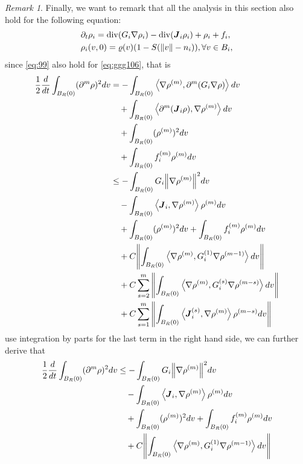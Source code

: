 \documentclass[a4paper, 11pt]{article}
\newcommand{\inner}[2]{\left< #1 , #2 \right>}
\newcounter{results}[section]
\theoremstyle{plain}
\theoremstyle{remark}
\newtheorem{remark}[results]{Remark}
\theoremstyle{definition}
\renewcommand{\div}{\mathrm{div}}
\newcommand{\intr}{\int_{B_R(0)}}
\newcommand{\J}{\boldsymbol{J}}
\begin{document}
\begin{remark}\label{rmk:g47}
Finally, we want to remark that all the analysis in this section also hold for the following equation:
\begin{equation}\label{eq:ggg106}
\begin{aligned}
&\partial_t\rho_i=\div(G_i\nabla\rho_i)-\div({\J_i}{\rho_i})+\rho_i+f_i,\\
&\rho_i(v,0)=\varrho(v)(1-S(\norm{v}-n_i)),\forall v\in B_i,
\end{aligned}
\end{equation}
since \eqref{eq:99} also hold for \eqref{eq:ggg106}, that is
\begin{equation}
\begin{aligned}
	\frac{1}{2}\frac{d}{dt}\intr(\partial^m\rho)^2dv&=-\intr\inner{\nabla\rho^{(m)}}{\partial^m(G_i\nabla\rho)}dv\\
&\quad+\intr\inner{\partial^m(\J_i\rho)}{\nabla\rho^{(m)}}dv\\
&\quad+\intr(\rho^{(m)})^2dv\\
&\quad+\intr f^{(m)}_i\rho^{(m)} dv\\
&\leq -\intr G_i\norm{\nabla\rho^{(m)}}^2 dv\\
&\quad-\intr\inner{\J_i}{\nabla\rho^{(m)}}\rho^{(m)}dv\\
&\quad+\intr(\rho^{(m)})^2dv+\intr f_i^{(m)}\rho^{(m)} dv\\
&\quad +C\norm{\intr\inner{\nabla\rho^{(m)}}{G_i^{(1)}\nabla\rho^{(m-1)}}dv}\\
&\quad+C\sum_{s=2}^m\norm{\intr \inner{\nabla\rho^{(m)}}{G_i^{(s)}\nabla\rho^{(m-s)}}dv}\\
&\quad +C\sum_{s=1}^m\norm{\intr\inner{\J_i^{(s)}}{\nabla\rho^{(m)}}\rho^{(m-s)}dv}\\
\end{aligned}
\end{equation}
use integration by parts for the last term in the right hand side, we can further derive that
\begin{equation}
	\begin{aligned}
			\frac{1}{2}\frac{d}{dt}\intr(\partial^m\rho)^2dv&\leq -\intr G_i\norm{\nabla\rho^{(m)}}^2 dv\\
		&\quad-\intr\inner{\J_i}{\nabla\rho^{(m)}}\rho^{(m)}dv\\
		&\quad+\intr(\rho^{(m)})^2dv+\intr f_i^{(m)}\rho^{(m)} dv\\
		&\quad +C\norm{\intr\inner{\nabla\rho^{(m)}}{G_i^{(1)}\nabla\rho^{(m-1)}}dv}\\

\end{aligned}
\end{equation}
\end{remark}
\end{document}
